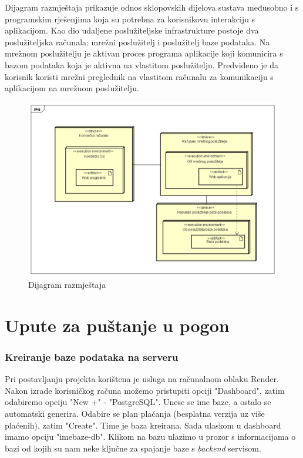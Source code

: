 			 \indent Dijagram razmještaja prikazuje odnos sklopovskih dijelova sustava međusobno i s programskim rješenjima koja su potrebna za korisnikovu interakciju s aplikacijom. Kao dio udaljene poslužiteljske infrastrukture postoje dva poslužiteljska računala: mrežni poslužitelj i poslužitelj baze podataka. Na mrežnom poslužitelju je aktivan proces programa aplikacije koji komunicira s bazom podataka koja je aktivna na vlastitom poslužitelju. Predviđeno je da korisnik koristi mrežni preglednik na vlastitom računalu za komunikaciju s aplikacijom na mrežnom poslužitelju.
			 
			 \begin{figure} [hbt!]
			 	\includegraphics[width=\linewidth]{Slike/DeploymentDiagram}
			 	\caption{Dijagram razmještaja}
			 \end{figure}
			
			\eject 
		
		\section{Upute za puštanje u pogon}
		
			\subsubsection{Kreiranje baze podataka na serveru}
			Pri postavljanju projekta korištena je usluga na računalnom oblaku Render. Nakon izrade korisničkog računa možemo pristupiti opciji "Dashboard", zatim odabiremo opciju "New +" - "PostgreSQL". Unese se ime baze, a ostalo se automatski generira. Odabire se plan plaćanja (besplatna verzija uz više plaćenih), zatim "Create". Time je baza kreirana. Sada ulaskom u dashboard imamo opciju "imebaze-db". Klikom na bazu ulazimo u prozor s informacijama o bazi od kojih su nam neke ključne za spajanje baze s \textit{backend} servisom.
			
